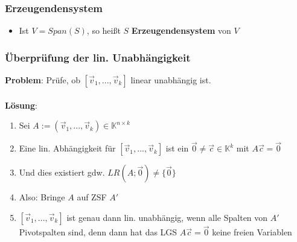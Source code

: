 \documentclass[titlepage]{article}
\newcommand{\K}{\mathbb{K}}
\newcommand{\1}{\mathbb{1}}
\newcommand{\0}{\mathbb{0}}
\begin{document}
				\subsubsection{Erzeugendensystem}
					\begin{itemize}
						\item Ist $V=Span(S)$, so heißt $S$ \textbf{Erzeugendensystem} von $V$
					\end{itemize}
				\subsubsection{Überprüfung der lin. Unabhängigkeit}
					\textbf{Problem}: Prüfe, ob $[\vec{v}_1,...,\vec{v}_k]$ linear unabhängig ist.\\\\
					\textbf{Lösung}:
					\begin{enumerate}
						 \item Sei $A:=(\vec{v}_1,...,\vec{v}_k)\in\K^{n\times k}$
						 \item Eine lin. Abhängigkeit für $[\vec{v}_1,...,\vec{v}_k]$ ist ein $\vec{0}\neq\vec{c}\in\K^k$ mit $A\vec{c}=\vec{0}$
						 \item Und dies existiert gdw. $LR(A;\vec{0})\neq\{\vec{0}\}$
						 \item Also: Bringe $A$ auf ZSF $A'$
						 \item $[\vec{v}_1,...,\vec{v}_k]$ ist genau dann lin. unabhängig, wenn alle Spalten von $A'$ Pivotspalten sind, denn dann hat das LGS $A\vec{c}=\vec{0}$ keine freien Variablen
					\end{enumerate}
\end{document}

